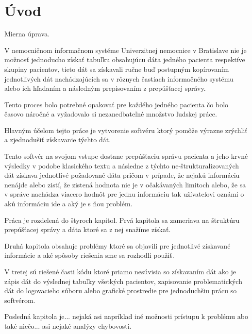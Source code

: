 \chapter*{Úvod} %

Mierna úprava.

V nemocničnom informačnom systéme Univerzitnej nemocnice v Bratislave nie je možnosť jednoducho získať tabuľku obsahujúcu dáta jedného pacienta respektíve skupiny pacientov, tieto dát sa získavali ručne buď postupným kopírovaním jednotlivých dát nachádzajúcich sa v rôznych častiach informačného systému alebo ich hľadaním a následným prepisovaním z prepúšťacej správy.

Tento proces bolo potrebné opakovať pre každého jedného pacienta čo bolo časovo náročné a vyžadovalo si nezanedbateľné množstvo ľudskej práce.

Hlavným účelom tejto práce je vytvorenie softvéru ktorý pomôže výrazne zrýchliť a zjednodušiť získavanie týchto dát.

Tento softvér na svojom vstupe dostane prepúšťaciu správu pacienta a jeho krvné výsledky v podobe klasického textu a následne z týchto ne-štrukturalizovaných dát získava jednotlivé požadované dáta pričom v prípade, že nejakú informáciu nenájde alebo zistí, že zistená hodnota nie je v očakávaných limitoch alebo, že sa v správe nachádza viacero hodnôt pre jednu informáciu tak užívateľovi oznámi o akú informáciu ide a aký je s ňou problém. 

Práca je rozdelená do štyroch kapitol. Prvá kapitola sa zameriava na štruktúru prepúšťacej správy a dáta ktoré sa z nej snažíme získať.

Druhá kapitola obsahuje problémy ktoré sa objavili pre jednotlivé získavané informácie a aké spôsoby riešenia sme sa rozhodli použiť.

V tretej sú riešené časti kódu ktoré priamo nesúvisia so získavaním dát ako je zápis dát do výslednej tabuľky všetkých pacientov, zapisovanie problematických dát do logovacieho súboru alebo grafické prostredie pre jednoduchšiu prácu so softvérom.

Posledná kapitola je... nejaká asi napríklad iné možnosti prístupu k problému abo také niečo... asi nejaké analýzy chybovosti.



